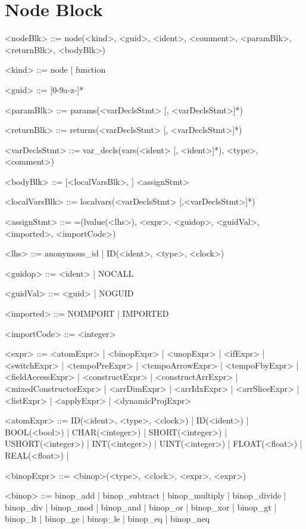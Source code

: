 \documentclass{article}
\begin{document}
\section{Node Block}
\begin{grammar} \small

<nodeBlk> ::= node(<kind>, <guid>, <ident>, <comment>, <paramBlk>, <returnBlk>, <bodyBlk>)

<kind> ::= node | function

<guid> ::= [0-9a-z-]*

<paramBlk> ::= params(<varDeclsStmt> [, <varDeclsStmt>]*)

<returnBlk> ::= returns(<varDeclsStmt> [, <varDeclsStmt>]*)

<varDeclsStmt> ::= var_decls(vars(<ident> [, <ident>]*), <type>, <comment>)

<bodyBlk> ::= [<localVarsBlk>, ] <assignStmt>

<localVarsBlk> ::= localvars(<varDeclsStmt> [,<varDeclsStmt>]*)

<assignStmt> ::= =(lvalue(<lhs>), <expr>, <guidop>, <guidVal>, <imported>, <importCode>)

<lhs> ::= anonymous_id | ID(<ident>, <type>, <clock>)

<guidop> ::= <ident> | NOCALL

<guidVal> ::= <guid> | NOGUID

<imported> ::= NOIMPORT | IMPORTED

<importCode> ::= <integer>

<expr> ::= <atomExpr> | <binopExpr> | <unopExpr> |
           <ifExpr> | <switchExpr> |
           <tempoPreExpr> | <tempoArrowExpr> | <tempoFbyExpr> |
           <fieldAccessExpr> | <constructExpr> | <constructArrExpr> | <mixedConstructorExpr> |
           <arrDimExpr> | <arrIdxExpr> | <arrSliceExpr> |
           <listExpr> | <applyExpr> | <dynamicProjExpr>

<atomExpr> ::= ID(<ident>, <type>, <clock>) | ID(<ident>) | BOOL(<bool>) | CHAR(<integer>) | SHORT(<integer>) | USHORT(<integer>) |
               INT(<integer>) | UINT(<integer>) | FLOAT(<float>) | REAL(<float>) |

<binopExpr> ::= <binop>(<type>, <clock>, <expr>, <expr>)

<binop> ::= binop_add | binop_subtract | binop_multiply |
            binop_divide | binop_div | binop_mod |
            binop_and | binop_or | binop_xor |
            binop_gt | binop_lt | binop_ge | binop_le |
            binop_eq | binop_neq


\end{grammar}
\end{document}
